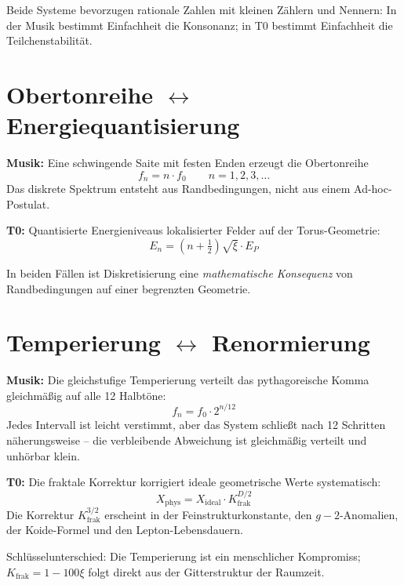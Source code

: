 Beide Systeme bevorzugen rationale Zahlen mit kleinen Zählern und Nennern: In der Musik bestimmt Einfachheit die Konsonanz; in T0 bestimmt Einfachheit die Teilchenstabilität.

\section{\texorpdfstring{Obertonreihe $\leftrightarrow$ Energiequantisierung}{Obertonreihe -- Energiequantisierung}}

\textbf{Musik:} Eine schwingende Saite mit festen Enden erzeugt die Obertonreihe
\begin{equation}
	f_n = n \cdot f_0 \qquad n = 1, 2, 3, \ldots
\end{equation}
Das diskrete Spektrum entsteht aus Randbedingungen, nicht aus einem Ad-hoc-Postulat.

\textbf{T0:} Quantisierte Energieniveaus lokalisierter Felder auf der Torus-Geometrie:
\begin{equation}
	E_n = \left(n + \tfrac{1}{2}\right) \sqrt{\xi} \cdot E_P
\end{equation}

In beiden Fällen ist Diskretisierung eine \emph{mathematische Konsequenz} von Randbedingungen auf einer begrenzten Geometrie.

\section{\texorpdfstring{Temperierung $\leftrightarrow$ Renormierung}{Temperierung -- Renormierung}}

\textbf{Musik:} Die gleichstufige Temperierung verteilt das pythagoreische Komma gleichmäßig auf alle 12 Halbtöne:
\begin{equation}
	f_n = f_0 \cdot 2^{n/12}
\end{equation}
Jedes Intervall ist leicht verstimmt, aber das System schließt nach 12 Schritten näherungsweise -- die verbleibende Abweichung ist gleichmäßig verteilt und unhörbar klein.

\textbf{T0:} Die fraktale Korrektur korrigiert ideale geometrische Werte systematisch:
\begin{equation}
	X_\text{phys} = X_\text{ideal} \cdot K_\text{frak}^{D/2}
\end{equation}
Die Korrektur $K_\text{frak}^{3/2}$ erscheint in der Feinstrukturkonstante, den $g-2$-Anomalien, der Koide-Formel und den Lepton-Lebensdauern.

Schlüsselunterschied: Die Temperierung ist ein menschlicher Kompromiss; $K_\text{frak} = 1 - 100\xi$ folgt direkt aus der Gitterstruktur der Raumzeit.

